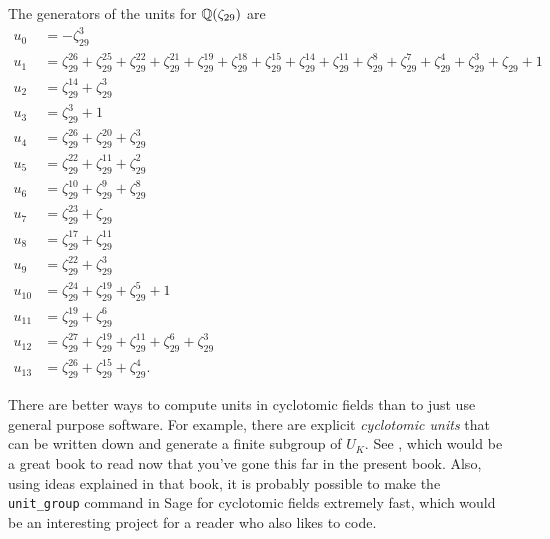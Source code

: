 The generators of the units for $\mathbb{Q}(\zeta_{29})$ are
\begin{align*}
u_{0} &= -\zeta_{29}^{3}\\
u_{1} &= \zeta_{29}^{26} + \zeta_{29}^{25} + \zeta_{29}^{22} + \zeta_{29}^{21} + \zeta_{29}^{19} + \zeta_{29}^{18} + \zeta_{29}^{15} + \zeta_{29}^{14} + \zeta_{29}^{11} + \zeta_{29}^{8} + \zeta_{29}^{7} + \zeta_{29}^{4} + \zeta_{29}^{3} + \zeta_{29} + 1\\
u_{2} &= \zeta_{29}^{14} + \zeta_{29}^{3}\\
u_{3} &= \zeta_{29}^{3} + 1\\
u_{4} &= \zeta_{29}^{26} + \zeta_{29}^{20} + \zeta_{29}^{3}\\
u_{5} &= \zeta_{29}^{22} + \zeta_{29}^{11} + \zeta_{29}^{2}\\
u_{6} &= \zeta_{29}^{10} + \zeta_{29}^{9} + \zeta_{29}^{8}\\
u_{7} &= \zeta_{29}^{23} + \zeta_{29}\\
u_{8} &= \zeta_{29}^{17} + \zeta_{29}^{11}\\
u_{9} &= \zeta_{29}^{22} + \zeta_{29}^{3}\\
u_{10} &= \zeta_{29}^{24} + \zeta_{29}^{19} + \zeta_{29}^{5} + 1\\
u_{11} &= \zeta_{29}^{19} + \zeta_{29}^{6}\\
u_{12} &= \zeta_{29}^{27} + \zeta_{29}^{19} + \zeta_{29}^{11} + \zeta_{29}^{6} + \zeta_{29}^{3}\\
u_{13} &= \zeta_{29}^{26} + \zeta_{29}^{15} + \zeta_{29}^{4}.
\end{align*}

There are better ways to compute units in cyclotomic fields than to
just use general purpose software. For example, there are explicit
{\em cyclotomic units} that can be written down and generate a finite
subgroup of $U_K$. See \cite[Ch.~8]{washington:cyclo}, which would be
a great book to read now that you've gone this far in the present book.
Also, using ideas explained in that book, it is probably
possible to make the \verb|unit_group| command in Sage for cyclotomic
fields extremely fast, which would be an interesting project for a
reader who also likes to code.


